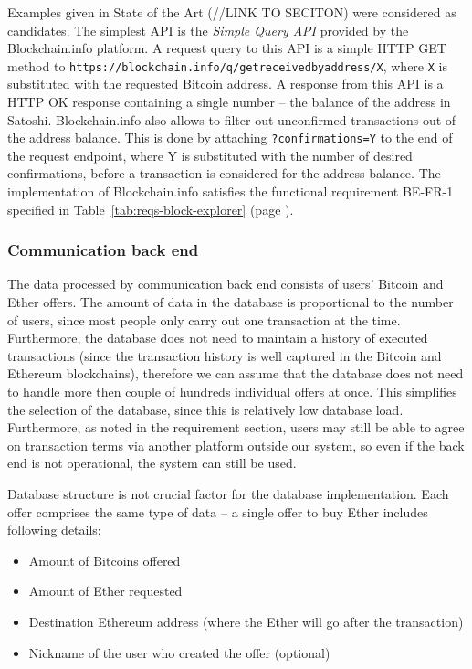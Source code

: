\begin{sloppypar}
Examples given in State of the Art (//LINK TO SECITON) were considered as candidates. The simplest API is the \textit{Simple Query API} provided by the Blockchain.info platform. A request query to this API is a simple HTTP GET method to \texttt{https://blockchain.info/q/getreceivedbyaddress/X}, where \texttt{X} is substituted with the requested Bitcoin address. A response from this API is a HTTP OK response containing a single number -- the balance of the address in Satoshi. Blockchain.info also allows to filter out unconfirmed transactions out of the address balance. This is done by attaching \texttt{?confirmations=Y} to the end of the request endpoint, where Y is substituted with the number of desired confirmations, before a transaction is considered for the address balance. The implementation of Blockchain.info satisfies the functional requirement BE-FR-1 specified in Table~\ref{tab:reqs-block-explorer} (page \pageref{tab:reqs-block-explorer}).
\end{sloppypar}
% 
% 
% 
% 
\subsubsection{Communication back end}
The data processed by communication back end consists of users' Bitcoin and Ether offers. The amount of data in the database is proportional to the number of users, since most people only carry out one transaction at the time. Furthermore, the database does not need to maintain a history of executed transactions (since the transaction history is well captured in the Bitcoin and Ethereum blockchains), therefore we can assume that the database does not need to handle more then couple of hundreds individual offers at once. This simplifies the selection of the database, since this is relatively low database load. Furthermore, as noted in the requirement section, users may still be able to agree on transaction terms via another platform outside our system, so even if the back end is not operational, the system can still be used. 

Database structure is not crucial factor for the database implementation. Each offer comprises the same type of data -- a single offer to buy Ether includes following details:
\begin{itemize}[noitemsep]
    \item Amount of Bitcoins offered
    \item Amount of Ether requested
    \item Destination Ethereum address (where the Ether will go after the transaction)
    \item Nickname of the user who created the offer (optional)
\end{itemize}

